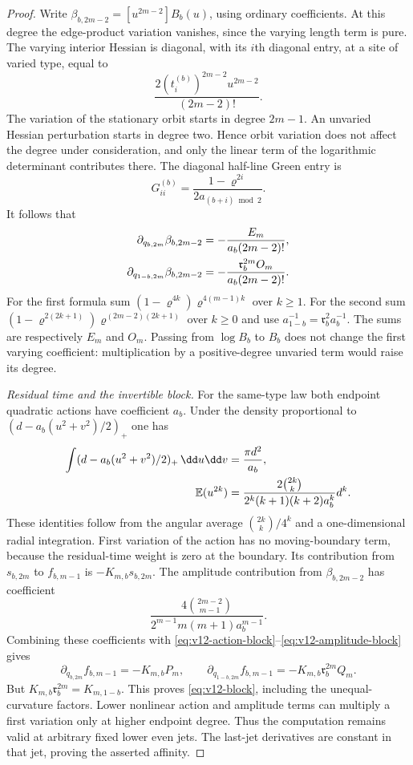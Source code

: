 \begin{proof}
Write $\beta_{b,2m-2}=[u^{2m-2}]B_b(u)$, using ordinary
coefficients. At this degree the edge-product variation vanishes,
since the varying length term is pure. The varying interior Hessian
is diagonal, with its $i$th diagonal entry, at a site of varied type,
equal to
\[
              \frac{2(t_i^{(b)})^{2m-2}u^{2m-2}}{(2m-2)!}.
\]
The variation of the stationary orbit starts in degree $2m-1$.
An unvaried Hessian perturbation starts in degree two. Hence orbit
variation does not affect the degree under consideration, and only
the linear term of the logarithmic determinant contributes there.
The diagonal half-line Green entry is
\[
 G^{(b)}_{ii}=\frac{1-\varrho^{2i}}{2a_{(b+i)\bmod2}}.
\]
It follows that
\begin{align}
 \partial_{q_{b,2m}}\beta_{b,2m-2}
 &=-\frac{E_m}{a_b(2m-2)!},\notag\\
 \partial_{q_{1-b,2m}}\beta_{b,2m-2}
 &=-\frac{\mathfrak r_b^{2m}O_m}{a_b(2m-2)!}.
                                      \label{eq:v12-amplitude-block}
\end{align}
For the first formula sum $(1-\varrho^{4k})\varrho^{4(m-1)k}$
over $k\ge1$. For the second sum
$(1-\varrho^{2(2k+1)})\varrho^{(2m-2)(2k+1)}$ over $k\ge0$
and use $a_{1-b}^{-1}=\mathfrak r_b^2a_b^{-1}$. The sums are respectively
$E_m$ and $O_m$. Passing from $\log B_b$ to $B_b$ does not change
the first varying coefficient: multiplication by a positive-degree
unvaried term would raise its degree.

\medskip\noindent\emph{Residual time and the invertible block.}
For the same-type law both endpoint quadratic actions have coefficient
$a_b$. Under the density proportional to
$(d-a_b(u^2+v^2)/2)_+$ one has
\begin{align}
 \int(d-a_b(u^2+v^2)/2)_+\,\dd u\dd v&=\frac{\pi d^2}{a_b},\notag\\
 \mathbb E(u^{2k})
 &=\frac{2\binom{2k}{k}}{2^k(k+1)(k+2)a_b^k}d^k.
                                      \label{eq:v12-moment}
\end{align}
These identities follow from the angular average
$\binom{2k}{k}/4^k$ and a one-dimensional radial integration.
First variation of the action has no moving-boundary term, because
the residual-time weight is zero at the boundary. Its contribution
from $s_{b,2m}$ to $f_{b,m-1}$ is $-K_{m,b}s_{b,2m}$.
The amplitude contribution from $\beta_{b,2m-2}$ has coefficient
\[
 \frac{4\binom{2m-2}{m-1}}
             {2^{m-1}m(m+1)a_b^{m-1}}.
\]
Combining these coefficients with
\eqref{eq:v12-action-block}--\eqref{eq:v12-amplitude-block} gives
\[
 \partial_{q_{b,2m}}f_{b,m-1}=-K_{m,b}P_m,
 \qquad
 \partial_{q_{1-b,2m}}f_{b,m-1}=-K_{m,b}\mathfrak r_b^{2m}Q_m.
\]
But $K_{m,b}\mathfrak r_b^{2m}=K_{m,1-b}$. This proves
\eqref{eq:v12-block}, including the unequal-curvature factors.
Lower nonlinear action and amplitude terms can multiply a first
variation only at higher endpoint degree. Thus the computation remains
valid at arbitrary fixed lower even jets. The last-jet derivatives
are constant in that jet, proving the asserted affinity.


\end{proof}
